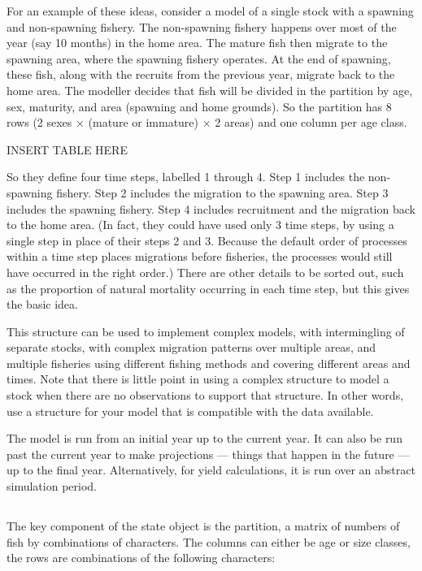 For an example of these ideas, consider a model of a single stock with a spawning and non-spawning fishery. The non-spawning fishery happens over most of the year (say 10 months) in the home area. The mature fish then migrate to the spawning area, where the spawning fishery operates. At the end of spawning, these fish, along with the recruits from the previous year, migrate back to the home area. The modeller decides that fish will be divided in the partition by age, sex, maturity, and area (spawning and home grounds). So the partition has 8 rows (2 sexes × (mature or immature) × 2 areas) and one column per age class. 
 
\KL INSERT TABLE HERE \KLend

So they define four time steps, labelled 1 through 4. Step 1 includes the non-spawning fishery. Step 2 includes the migration to the spawning area. Step 3 includes the spawning fishery. Step 4 includes recruitment and the migration back to the home area. (In fact, they could have used only 3 time steps, by using a single step in place of their steps 2 and 3. Because the default order of processes within a time step places migrations before fisheries, the processes would still have occurred in the right order.) There are other details to be sorted out, such as the proportion of natural mortality occurring in each time step, but this gives the basic idea. 

This structure can be used to implement complex models, with intermingling of separate stocks, with complex migration patterns over multiple areas, and multiple fisheries using different fishing methods and covering different areas and times. Note that there is little point in using a complex structure to model a stock when there are no observations to support that structure. In other words, use a structure for your model that is compatible with the data available. 

The model is run from an initial year up to the current year. It can also be run past the current year to make projections — things that happen in the future — up to the final year. Alternatively, for yield calculations, it is run over an abstract simulation period.


\subsection{}

The key component of the state object is the partition, a matrix of numbers of fish by combinations of characters. The columns can either be age or size classes, the rows are combinations of the following characters: 

